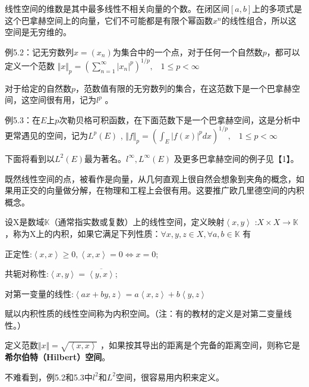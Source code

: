 \songti\setlength{\leftskip}{0em}

线性空间的维数是其中最多线性不相关向量的个数。在闭区间$ [a,b] $上的多项式是这个巴拿赫空间上的向量，它们不可能都是有限个幂函数$ x^n $的线性组合，所以这空间是无穷维的。

\kaishu\setlength{\leftskip}{1em}

例5.2：记无穷数列$ x = (x_n) $为集合中的一个点，对于任何一个自然数$ p $，都可以定义一个范数 $ \Vert x \Vert_p = (\sum_{n=1}^\infty |x_n|^p)^{1/p},\;\;\; 1\le p<\infty  $

对于给定的自然数$ p $，范数值有限的无穷数列的集合，在这范数下是一个巴拿赫空间，这空间很有用，记为$ l^p $ 。

例5.3：在$ E $上$ p $次勒贝格可积函数，在下面范数下是一个巴拿赫空间，这是分析中更常遇见的空间，记为$ L^p(E) $
, $ \Vert f \Vert_p = (\int_E|f(x)|^p dx)^{1/p},\;\;\; 1\le p<\infty $

\songti\setlength{\leftskip}{0em}

下面将看到以$ L^2(E) $最为著名。$ l^\infty,L^\infty(E) $ 及更多巴拿赫空间的例子见【1】。

既然线性空间的点，被看作是向量，从几何直观上很自然会想象到夹角的概念，如果用正交的向量做分解，在物理和工程上会很有用。这要推广欧几里德空间的内积概念。

\kaishu\setlength{\leftskip}{1em}

设X是数域$ \mathbb{K} $（通常指实数或复数）上的线性空间，定义映射$ \left\langle x,y \right \rangle $ :$ X\times X\rightarrow \mathbb{K} $，称为X上的内积，如果它满足下列性质：$ \forall x,y,z\in X, \forall a,b \in \mathbb{K} $ 有

正定性:$ \left\langle x,x\right \rangle \ge 0, \left \langle x,x \right \rangle = 0\Leftrightarrow x=0 $;

共轭对称性:$ \left\langle x,y \right \rangle = \overline{\left \langle y,x \right \rangle} $;

对第一变量的线性:$ \left\langle ax+by,z \right \rangle = a\left \langle x,z \right \rangle + b \left\langle y,z \right \rangle $ 

赋以内积性质的线性空间称为内积空间。（注：有的教材的定义是对第二变量线性。）

定义范数$ \Vert x \Vert = \sqrt{\left \langle x,x \right \rangle} $ ，如果按其导出的距离是个完备的距离空间，则称它是\textbf{希尔伯特（Hilbert）空间}。

\songti\setlength{\leftskip}{0em}

不难看到，例5.2和5.3中$ l^2 $和$ L^2 $空间，很容易用内积来定义。

